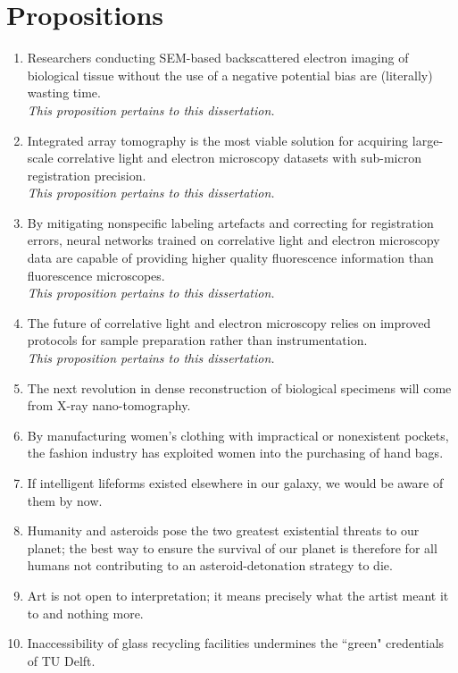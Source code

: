 \section*{Propositions}

\begin{enumerate}
    \item Researchers conducting SEM-based backscattered electron imaging of biological tissue without the use of a negative potential bias are (literally) wasting time. \\
    \textit{This proposition pertains to this dissertation.}
    \item Integrated array tomography is the most viable solution for acquiring large-scale correlative light and electron microscopy datasets with sub-micron registration precision. \\
    \textit{This proposition pertains to this dissertation.}
    \item By mitigating nonspecific labeling artefacts and correcting for registration errors, neural networks trained on correlative light and electron microscopy data are capable of providing higher quality fluorescence information than fluorescence microscopes. \\
    \textit{This proposition pertains to this dissertation.}
    \item The future of correlative light and electron microscopy relies on improved protocols for sample preparation rather than instrumentation. \\
    \textit{This proposition pertains to this dissertation.}
    \item The next revolution in dense reconstruction of biological specimens will come from X-ray nano-tomography.
    \item By manufacturing women's clothing with impractical or nonexistent pockets, the fashion industry has exploited women into the purchasing of hand bags.
    \item If intelligent lifeforms existed elsewhere in our galaxy, we would be aware of them by now.
    \item Humanity and asteroids pose the two greatest existential threats to our planet; the best way to ensure the survival of our planet is therefore for all humans not contributing to an asteroid-detonation strategy to die.
    \item Art is not open to interpretation; it means precisely what the artist meant it to and nothing more.
    \item Inaccessibility of glass recycling facilities undermines the ``green" credentials of TU Delft.
\end{enumerate}

